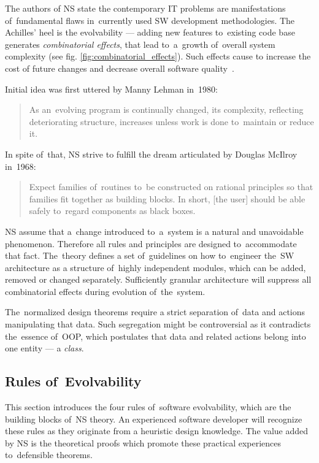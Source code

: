 \documentclass[thesis=M,english,hidelinks]{FITthesis}[2012/10/20]
\begin{document}
The authors of \acrlong{NS} state the contemporary \acrshort{IT} problems are manifestations of~fundamental flaws in~currently used \acrshort{SW} development methodologies. The Achilles' heel is the evolvability --- adding new features to~existing code base generates \emph{combinatorial effects}, that lead to~a~growth of~overall system complexity (see fig. \ref{fig:combinatorial_effects}). Such effects cause to increase the cost of future changes and decrease overall software quality~.\cite{ns-recreating}

Initial idea was first uttered by Manny Lehman in~1980:

\begin{quote}
As an~evolving program is continually changed, its complexity, reflecting deteriorating structure, increases unless work is done to~maintain or reduce it.~\cite{lehman-1980-programs}
\end{quote}

In spite of~that, \acrlong{NS} strive to fulfill the dream articulated by Douglas McIlroy in~1968:

\begin{quote}
Expect families of~routines to~be constructed on rational principles so that families fit together as building blocks. In short, [the user] should be able safely to~regard components as black boxes.~\cite{mcilroy-1968-mass-software}
\end{quote}

\acrshort{NS} assume that a~change introduced to~a~system is a natural and unavoidable phenomenon. Therefore all rules and principles are designed to~accommodate that fact. The~theory defines a set of~guidelines on how to~engineer the~\acrlong{SW} architecture as a structure of~highly independent modules, which can be added, removed or changed separately. Sufficiently granular architecture will suppress all combinatorial effects during evolution of~the~system.

The~normalized design theorems require a strict separation of~data and actions manipulating that data. Such segregation might be controversial as it contradicts the~essence of~\acrfull{OOP}, which postulates that data and related actions belong into one entity --- a \textit{class}.

\subsection{Rules of~Evolvability}
This section introduces the four rules of~software evolvability, which are the building blocks of~\acrshort{NS} theory. An experienced software developer will recognize these rules as they originate from a heuristic design knowledge. The value added by \acrshort{NS} is the theoretical proofs which promote these practical experiences to~defensible theorems.
\end{document}
